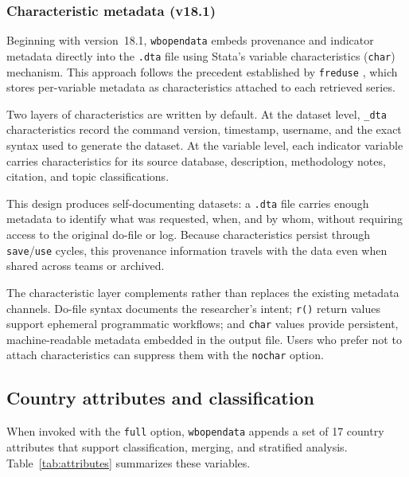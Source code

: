 \documentclass[bib]{statapress}
\begin{document}
\subsubsection*{Characteristic metadata (v18.1)}

Beginning with version~18.1, \texttt{wbopendata} embeds provenance and
indicator metadata directly into the \texttt{.dta} file using Stata's variable
characteristics (\texttt{char}) mechanism. This approach follows the precedent
established by \texttt{freduse} \citep{drukker2006freduse}, which stores
per-variable metadata as characteristics attached to each retrieved series.

Two layers of characteristics are written by default. At the dataset level,
\texttt{\_dta} characteristics record the command version, timestamp, username,
and the exact syntax used to generate the dataset. At the variable level, each
indicator variable carries characteristics for its source database, description,
methodology notes, citation, and topic classifications.

This design produces self-documenting datasets: a \texttt{.dta} file carries
enough metadata to identify what was requested, when, and by whom, without
requiring access to the original do-file or log. Because characteristics
persist through \texttt{save}/\texttt{use} cycles, this provenance information
travels with the data even when shared across teams or archived.

The characteristic layer complements rather than replaces the existing metadata
channels. Do-file syntax documents the researcher's intent; \texttt{r()} return
values support ephemeral programmatic workflows; and \texttt{char} values
provide persistent, machine-readable metadata embedded in the output file.
Users who prefer not to attach characteristics can suppress them with the
\texttt{nochar} option.

\subsection{Country attributes and classification}

When invoked with the \texttt{full} option, \texttt{wbopendata} appends a set of
17 country attributes that support classification, merging, and stratified
analysis. Table~\ref{tab:attributes} summarizes these variables.
\end{document}
